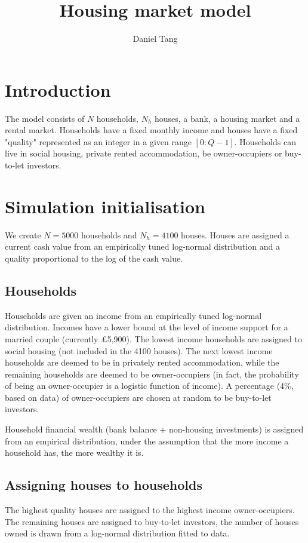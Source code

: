 \documentclass[a4paper]{article}
\title{Housing market model}
\author{Daniel Tang}
\begin{document}
\maketitle


\section{Introduction}

The model consists of $N$ households, $N_h$ houses, a bank, a housing market and a rental market. Households have a fixed monthly income and houses have a fixed "quality" represented as an integer in a given range $[0:Q-1]$. Households can live in social housing, private rented accommodation, be owner-occupiers or buy-to-let investors.

\section{Simulation initialisation}

We create $N=5000$ households and $N_h=4100$ houses. Houses are assigned a current cash value from an empirically tuned log-normal distribution and a quality proportional to the log of the cash value.

\subsection{Households}
Households are given an income from an empirically tuned log-normal distribution. Incomes have a lower bound at the level of income support for a married couple (currently \pounds 5,900). The lowest income households are assigned to social housing (not included in the 4100 houses). The next lowest income households are deemed to be in privately rented accommodation, while the remaining households are deemed to be owner-occupiers (in fact, the probability of being an owner-occupier is a logistic function of income). A percentage (4\%, based on data) of owner-occupiers are chosen at random to be buy-to-let investors.

Household financial wealth (bank balance + non-housing investments) is assigned from an empirical distribution, under the assumption that the more income a household has, the more wealthy it is.

\subsection{Assigning houses to households}
The highest quality houses are assigned to the highest income owner-occupiers. The remaining houses are assigned to buy-to-let investors, the number of houses owned is drawn from a log-normal distribution fitted to data.
\end{document}
